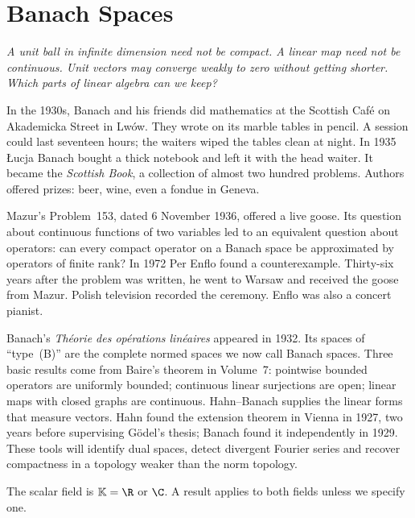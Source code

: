 \chapter{Banach Spaces}\label{ch:banach}

\begin{center}\itshape
A unit ball in infinite dimension need not be compact. A linear map need not be continuous. Unit vectors may converge weakly to zero without getting shorter. Which parts of linear algebra can we keep?
\end{center}

In the 1930s, Banach and his friends did mathematics at the Scottish Caf\'e on Akademicka Street in Lw\'ow. They wrote on its marble tables in pencil. A session could last seventeen hours; the waiters wiped the tables clean at night. In 1935 \L ucja Banach bought a thick notebook and left it with the head waiter. It became the \emph{Scottish Book}, a collection of almost two hundred problems. Authors offered prizes: beer, wine, even a fondue in Geneva.

Mazur's Problem~153, dated 6 November 1936, offered a live goose. Its question about continuous functions of two variables led to an equivalent question about operators: can every compact operator on a Banach space be approximated by operators of finite rank? In 1972 Per Enflo found a counterexample. Thirty-six years after the problem was written, he went to Warsaw and received the goose from Mazur. Polish television recorded the ceremony. Enflo was also a concert pianist.

Banach's \emph{Th\'eorie des op\'erations lin\'eaires} appeared in 1932. Its spaces of ``type~(B)'' are the complete normed spaces we now call Banach spaces. Three basic results come from Baire's theorem in Volume~7: pointwise bounded operators are uniformly bounded; continuous linear surjections are open; linear maps with closed graphs are continuous. Hahn--Banach supplies the linear forms that measure vectors. Hahn found the extension theorem in Vienna in 1927, two years before supervising G\"odel's thesis; Banach found it independently in 1929. These tools will identify dual spaces, detect divergent Fourier series and recover compactness in a topology weaker than the norm topology.


The scalar field is $\mathbb K=\R$ or $\C$. A result applies to both fields unless we specify one.


